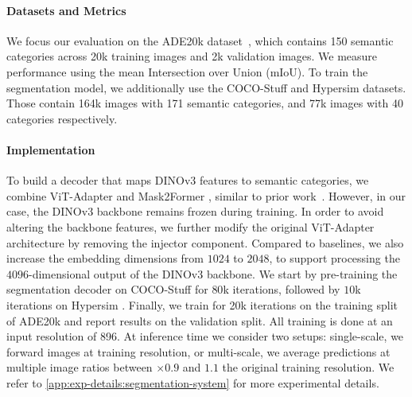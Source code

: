 \paragraph{Datasets and Metrics}
We focus our evaluation on the ADE20k dataset~\citep{zhou2017scene}, which contains 150 semantic categories across 20k training images and 2k validation images.
We measure performance using the mean Intersection over Union (mIoU).
To train the segmentation model, we additionally use the COCO-Stuff \citep{caesar2018coco} and Hypersim \citep{roberts2021hypersim} datasets.
Those contain 164k images with 171 semantic categories, and 77k images with 40 categories respectively. 

\paragraph{Implementation}
To build a decoder that maps DINOv3 features to semantic categories, we combine ViT-Adapter \citep{chen2022vitadapter} and Mask2Former \citep{cheng2021mask2former}, similar to prior work~\citep{wang2022image,wang2022internimage,wang2023onepeace}.
However, in our case, the DINOv3 backbone remains frozen during training.
In order to avoid altering the backbone features, we further modify the original ViT-Adapter architecture by removing the injector component.
Compared to baselines, we also increase the embedding dimensions from $1024$ to $2048$, to support processing the $4096$-dimensional output of the DINOv3 backbone.
We start by pre-training the segmentation decoder on COCO-Stuff for $80$k iterations, followed by $10$k iterations on Hypersim \citep{roberts2021hypersim}.
Finally, we train for 20k iterations on the training split of ADE20k and report results on the validation split. 
All training is done at an input resolution of 896.
At inference time we consider two setups: single-scale, \ie we forward images at training resolution, or multi-scale, \ie we average predictions at multiple image ratios between \({\times}0.9\) and \(1.1\) the original training resolution.
We refer to \cref{app:exp-details:segmentation-system} for more experimental details.

